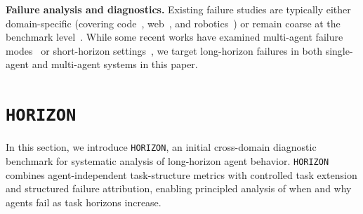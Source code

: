 \documentclass[11pt]{article}
\begin{document}

\textbf{Failure analysis and diagnostics.}
Existing failure studies are typically either domain-specific (covering code~\citep{chen2023teaching}, web~\citep{koh2024visualwebarena}, and robotics~\citep{zeng2020tossingbot}) or remain coarse at the benchmark level~\citep{liu2023agentbench}. While some recent works have examined multi-agent failure modes~\citep{zhang2025agentcausestaskfailures, yu2025correctcondensederrorrecognition, cemri2025multiagentllmsystemsfail} or short-horizon settings~\citep{zhu2025llmagentsfaillearn}, we target long-horizon failures in both single-agent and multi-agent systems in this paper.

\section{\texttt{HORIZON}} \label{sec:horizon}

In this section, we introduce \texttt{HORIZON}, an initial cross-domain diagnostic benchmark for systematic analysis of long-horizon agent behavior. \texttt{HORIZON} combines agent-independent task-structure metrics with controlled task extension and structured failure attribution, enabling principled analysis of when and why agents fail as task horizons increase. 
\end{document}
